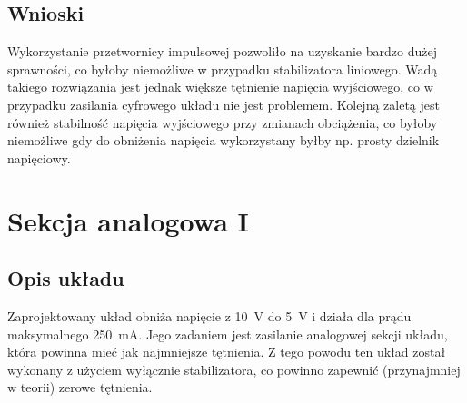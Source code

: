 \documentclass[11pt]{article}
\begin{document}
\subsection{Wnioski}
Wykorzystanie przetwornicy impulsowej pozwoliło na uzyskanie bardzo dużej sprawności, co byłoby niemożliwe w przypadku stabilizatora liniowego. Wadą takiego rozwiązania jest jednak większe tętnienie napięcia wyjściowego, co w przypadku zasilania cyfrowego układu nie jest problemem. Kolejną zaletą jest również stabilność napięcia wyjściowego przy zmianach obciążenia, co byłoby niemożliwe gdy do obniżenia napięcia wykorzystany byłby np. prosty dzielnik napięciowy.


\section{Sekcja analogowa I}
\subsection{Opis układu}
Zaprojektowany układ obniża napięcie z \SI{10}{\V} do \SI{5}{\V} i działa dla prądu maksymalnego \SI{250}{\milli\A}. Jego zadaniem jest zasilanie analogowej sekcji układu, która powinna mieć jak najmniejsze tętnienia. Z tego powodu ten układ został wykonany z użyciem wyłącznie stabilizatora, co powinno zapewnić (przynajmniej w teorii) zerowe tętnienia.
\end{document}
